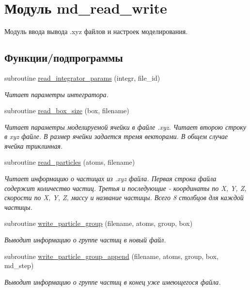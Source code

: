 \hypertarget{namespacemd__read__write}{}\section{Модуль md\+\_\+read\+\_\+write}
\label{namespacemd__read__write}


Модуль ввода вывода .xyz файлов и настроек моделирования.  


\subsection*{Функции/подпрограммы}
\begin{DoxyCompactItemize}
\item 
subroutine \mbox{\hyperlink{namespacemd__read__write_a13e739c9b44b3100ee36e864eac3d5e0}{read\+\_\+integrator\+\_\+params}} (integr, file\+\_\+id)
\begin{DoxyCompactList}\small\item\em Читает параметры интегратора. \end{DoxyCompactList}\item 
subroutine \mbox{\hyperlink{namespacemd__read__write_ace09a29b4fd526f8ed784c90098279c4}{read\+\_\+box\+\_\+size}} (box, filename)
\begin{DoxyCompactList}\small\item\em Читает параметры моделируемой ячейки в файле .xyz.  Читает второю строку в xyz файле. В размер ячейки задается тремя векторами. В общем случае ячейка триклинная. \end{DoxyCompactList}\item 
subroutine \mbox{\hyperlink{namespacemd__read__write_a1a0fd7df876318fd4247d110936384d8}{read\+\_\+particles}} (atoms, filename)
\begin{DoxyCompactList}\small\item\em Читает информацию о частицах из .xyz файла.  Первая строка файла содержит количество частиц. Третья и последующие -\/ координаты по X, Y, Z, скорости по X, Y, Z, массу и название частицы. Всего 8 столбцов для каждой частицы. \end{DoxyCompactList}\item 
subroutine \mbox{\hyperlink{namespacemd__read__write_a20f73c896cf124f2e1da6ccbf23cc12d}{write\+\_\+particle\+\_\+group}} (filename, atoms, group, box)
\begin{DoxyCompactList}\small\item\em Выводит информацию о группе частиц в новый файл. \end{DoxyCompactList}\item 
subroutine \mbox{\hyperlink{namespacemd__read__write_a24453b47bb1935e66563cd522e09e3af}{write\+\_\+particle\+\_\+group\+\_\+append}} (filename, atoms, group, box, md\+\_\+step)
\begin{DoxyCompactList}\small\item\em Выводит информацию о группе частиц в конец уже имеющегося файла. \end{DoxyCompactList}\end{DoxyCompactItemize}


